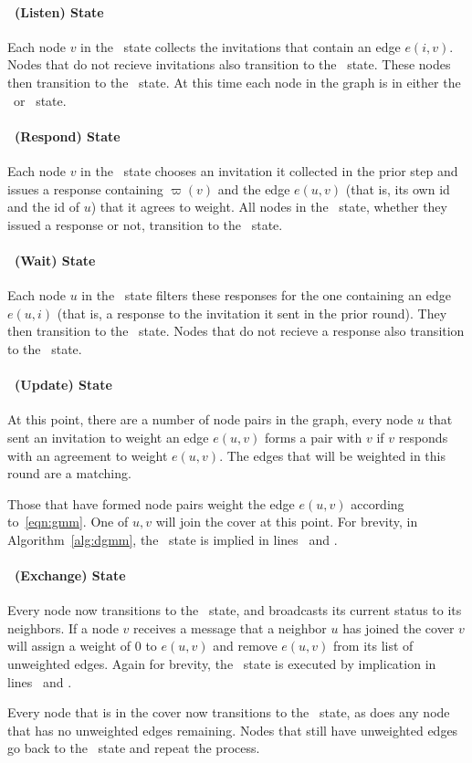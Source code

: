 \paragraph{\cLd\ (Listen) State} 
Each node $v$ in the \cLd\ state collects the invitations that contain an edge $e(i,v)$. Nodes that do not recieve invitations also transition to the \cRd\ state. These nodes then transition to the \cRd\ state. At this time each node in the graph is in either the \cRd\ or \cWd\ state. 

\paragraph{\cRd\ (Respond) State}
Each node $v$ in the \cRd\ state chooses an invitation it collected in the prior step and issues a response containing $\varpi(v)$ and the edge $e(u,v)$ (that is, its own id and the id of $u$) that it agrees to weight. All nodes in the \cRd\ state, whether they issued a response or not, transition to the \cUd\ state. 

\paragraph{\cWd\ (Wait) State}
Each node $u$ in the \cWd\ state filters these responses for the one containing an edge $e(u,i)$ (that is, a response to the invitation it sent in the prior round). They then transition to the \cUd\ state. Nodes that do not recieve a response also transition to the \cUd\ state. 

\paragraph{\cUd\ (Update) State}

At this point, there are a number of node pairs in the graph, every node $u$ that sent an invitation to weight an edge $e(u,v)$ forms a pair with $v$ if $v$ responds with an agreement to weight $e(u,v)$. The edges that will be weighted in this round are a matching.

Those that have formed node pairs weight the edge $e(u,v)$ according to~\eqref{eqn:gmm}. One of $u,v$ will join the cover at this point. For brevity, in Algorithm~\ref{alg:dgmm}, the \cUd\ state is implied in lines~ and .

\paragraph{\cEd\ (Exchange) State}
Every node now transitions to the \cEd\ state, and broadcasts its current status to its neighbors. If a node $v$ receives a message that a neighbor $u$ has joined the cover $v$ will assign a weight of 0 to $e(u,v)$ and remove $e(u,v)$ from its list of unweighted edges. Again for brevity, the \cEd\ state is executed by implication in lines~ and .

Every node that is in the cover now transitions to the \cDd\ state, as does any node that has no unweighted edges remaining. Nodes that still have unweighted edges go back to the \cCd\ state and repeat the process. 


